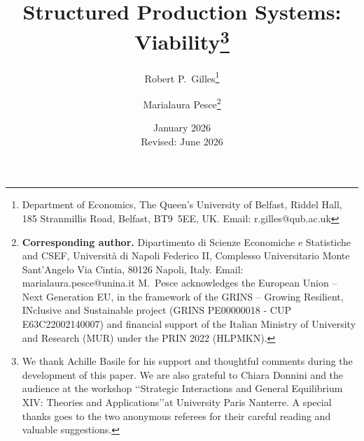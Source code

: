 \documentclass[11pt,fleqn]{article}
\begin{document}
\title{\textbf{Structured Production Systems: Viability}\thanks{We thank Achille Basile for his support and thoughtful comments during the development of this paper. We are also grateful to Chiara Donnini and the audience at the workshop \lq \lq Strategic Interactions and General Equilibrium XIV:  Theories and Applications\rq \rq  at University Paris Nanterre. A special thanks goes to the two anonymous referees for their careful reading and valuable suggestions. }}

\author{Robert P.~Gilles\thanks{Department of Economics, The Queen's University of Belfast, Riddel Hall, 185 Stranmillis Road, Belfast, BT9~5EE, UK. \textsf{Email: r.gilles@qub.ac.uk}} \and Marialaura Pesce\thanks{\textbf{Corresponding author.}  Dipartimento di Scienze Economiche e Statistiche and CSEF, Universit\`a di Napoli Federico II, Complesso Universitario Monte Sant'Angelo Via Cintia, 80126 Napoli, Italy. \textsf{Email: marialaura.pesce@unina.it} M.~Pesce acknowledges the European Union -- Next Generation EU, in the framework of the GRINS -- Growing Resilient, INclusive and Sustainable project (GRINS PE00000018 - CUP E63C22002140007) and financial support of the Italian Ministry of University and Research (MUR) under the PRIN 2022 (HLPMKN). }}

\date{January 2026 \\ Revised: June 2026}


\maketitle
\end{document}

